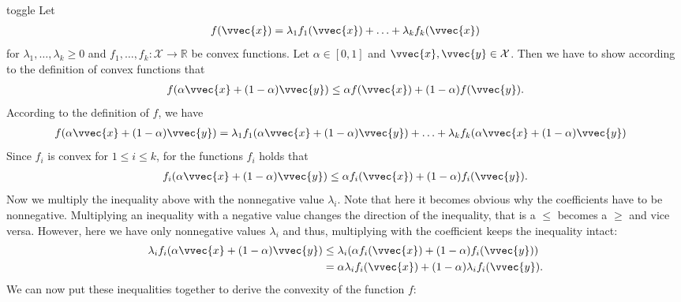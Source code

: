 \documentclass[letterpaper,10pt,english]{jupyterBook}
\begin{document}
\begin{enumerate}
\begin{sphinxuseclass}{toggle}
\sphinxAtStartPar
Let
\begin{equation*}
\begin{split}f(\vvec{x}) = \lambda_1 f_1(\vvec{x})+\ldots + \lambda_k f_k(\vvec{x})\end{split}
\end{equation*}
for \(\lambda_1,\ldots,\lambda_k\geq 0\) and \(f_1,\ldots,f_k:\mathcal{X}\rightarrow \mathbb{R}\) be convex functions. Let \(\alpha\in[0,1]\) and \(\vvec{x},\vvec{y}\in\mathcal{X}\). Then we have to show according to the definition of convex functions that
\begin{equation*}
\begin{split}f(\alpha\vvec{x}+(1-\alpha)\vvec{y})\leq \alpha f(\vvec{x})+(1-\alpha)f(\vvec{y}).\end{split}
\end{equation*}
According to the definition of \(f\), we have
\begin{align*}
    f(\alpha\vvec{x}+(1-\alpha)\vvec{y}) &= \lambda_1 f_1(\alpha\vvec{x}+(1-\alpha)\vvec{y})+\ldots + \lambda_k f_k(\alpha\vvec{x}+(1-\alpha)\vvec{y})
\end{align*}
\sphinxAtStartPar
Since \(f_i\) is convex for \(1\leq i\leq k\), for the functions \(f_i\) holds that
\begin{equation*}
\begin{split}f_i(\alpha\vvec{x}+(1-\alpha)\vvec{y})\leq \alpha f_i(\vvec{x})+(1-\alpha)f_i(\vvec{y}).\end{split}
\end{equation*}
Now we multiply the inequality above with the nonnegative value \(\lambda_i\). Note that here it becomes obvious why the coefficients have to be nonnegative. Multiplying an inequality with a negative value changes the direction of the inequality, that is a \(\leq\) becomes a \(\geq\) and vice versa. However, here we have only nonnegative values \(\lambda_i\) and thus, multiplying with the coefficient keeps the inequality intact:
\label{equation:optimization_exercises:9453c072-26d5-4d0f-b572-ad33bbd45345}\begin{align}
    \lambda_if_i(\alpha\vvec{x}+(1-\alpha)\vvec{y})&\leq \lambda_i(\alpha f_i(\vvec{x})+(1-\alpha)f_i(\vvec{y}))\nonumber\\ 
    &= \alpha \lambda_i f_i(\vvec{x})+(1-\alpha)\lambda_i f_i(\vvec{y}).\label{eq:ficonv}
\end{align}
\sphinxAtStartPar
We can now put these inequalities together to derive the convexity of the function \(f\):

\end{sphinxuseclass}
\end{enumerate}
\end{document}
